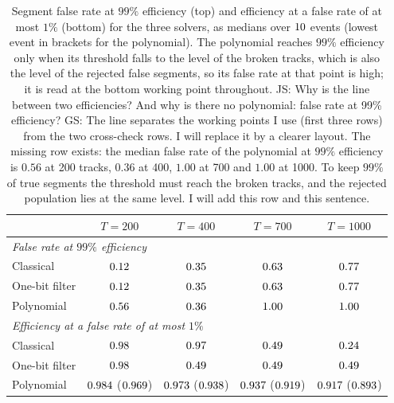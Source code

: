 \documentclass[11pt,a4paper]{article}
\newcommand{\js}[1]{{\color{blue} JS: #1 }}
\newcommand{\gs}[1]{{\color{orange!85!black} GS: #1 }}
\begin{document}
\begin{table}[H]
\centering\small
\caption{Segment false rate at $99\%$ efficiency (top) and efficiency at a false rate of at most $1\%$
(bottom) for the three solvers, as medians over $10$ events (lowest event in brackets for the
polynomial). The polynomial reaches $99\%$ efficiency only when its threshold falls to the level of the
broken tracks, which is also the level of the rejected false segments, so its false rate at that point
is high; it is read at
the bottom working point throughout. \js{Why is the line between two efficiencies? And why is there no polynomial: false rate at 99\% efficiency? } \gs{The line separates the working points I use (first three rows) from the two cross-check rows. I will replace it by a clearer layout. The missing row exists: the median false rate of the polynomial at $99\%$ efficiency is $0.56$ at 200 tracks, $0.36$ at 400, $1.00$ at 700 and $1.00$ at 1000. To keep $99\%$ of true segments the threshold must reach the broken tracks, and the rejected population lies at the same level. I will add this row and this sentence.  }}
\label{tab:headline}
\begin{tabular}{lcccc}\toprule
 & $T=200$ & $T=400$ & $T=700$ & $T=1000$\\\midrule
\multicolumn{5}{l}{\textit{False rate at $99\%$ efficiency}}\\
Classical & $0.12$ & $0.35$ & $0.63$ & $0.77$\\
One-bit filter & $0.12$ & $0.35$ & $0.63$ & $0.77$\\
Polynomial & $0.56$ & $0.36$ & $1.00$ & $1.00$\\
\midrule
\multicolumn{5}{l}{\textit{Efficiency at a false rate of at most $1\%$}}\\
Classical & $0.98$ & $0.97$ & $0.49$ & $0.24$\\
One-bit filter & $0.98$ & $0.49$ & $0.49$ & $0.49$\\
Polynomial & $0.984$ ($0.969$) & $0.973$ ($0.938$) & $0.937$ ($0.919$) & $0.917$ ($0.893$)\\\bottomrule
\end{tabular}
\end{table}
\end{document}
